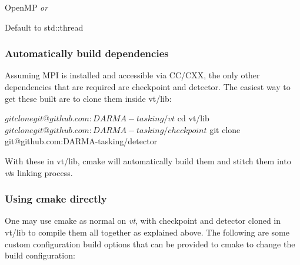 \begin{DoxyItemize}
\item Open\+MP {\itshape or}
\item Default to {\ttfamily std\+::thread}
\end{DoxyItemize}\hypertarget{vt-build_automatic-build-deps}{}\subsubsection{Automatically build dependencies}\label{vt-build_automatic-build-deps}
Assuming M\+PI is installed and accessible via C\+C/\+C\+XX, the only other dependencies that are required are checkpoint and detector. The easiest way to get these built are to clone them inside {\ttfamily vt/lib}\+:


\begin{DoxyCode}
$ git clone git@github.com:DARMA-tasking/vt
$ cd vt/lib
$ git clone git@github.com:DARMA-tasking/checkpoint
$ git clone git@github.com:DARMA-tasking/detector
\end{DoxyCode}


With these in {\ttfamily vt/lib}, cmake will automatically build them and stitch them into {\itshape vt}\textquotesingle{}s linking process.\hypertarget{vt-build_use-cmake-directly-vars}{}\subsubsection{Using cmake directly}\label{vt-build_use-cmake-directly-vars}
One may use {\ttfamily cmake} as normal on {\itshape vt}, with checkpoint and detector cloned in {\ttfamily vt/lib} to compile them all together as explained above. The following are some custom configuration build options that can be provided to {\ttfamily cmake} to change the build configuration\+:

